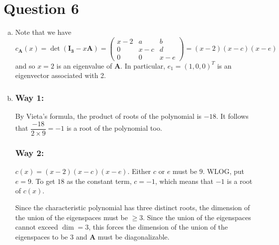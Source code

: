 \documentclass{article}
\newcommand{\matr}[1]{\mathbf{#1}}
\begin{document}
\section*{Question 6}
\begin{enumerate}[(a)]
    \item Note that we have $$c_\textbf{A}(x)=\det(\matr{I_3}-x\matr A)=\begin{pmatrix}x-2&a&b\\0&x-c&d\\0&0&x-e\end{pmatrix}=(x-2)(x-c)(x-e)$$ and so $x=2$ is an eigenvalue of $\matr{A}.$ In particular, $e_1=(1,0,0)^T$ is an eigenvector associated with 2.
    \item 
    \subsubsection*{Way 1:}
    By Vieta's formula, the product of roots of the polynomial is $-18.$ It follows that $\dfrac{-18}{2\times9}=-1$ is a root of the polynomial too.
    \subsubsection*{Way 2:}
    $c(x)=(x-2)(x-c)(x-e)$. Either $c$ or $e$ must be $9$. WLOG, put $e=9$. To get $18$ as the constant term, $c=-1$, which means that $-1$ is a root of $c(x)$.
    
    Since the characteristic polynomial has three distinct roots, the dimension of the union of the eigenspaces must be $\geq 3$. Since the union of the eigenspaces cannot exceed $\dim = 3$, this forces the dimension of the union of the eigenspaces to be 3 and $\matr{A}$ must be diagonalizable.
\end{enumerate}
\end{document}
